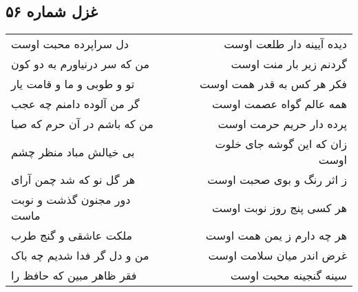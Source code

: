 \begin{center}
\section*{غزل شماره ۵۶}
\label{sec:sh056}
\begin{longtable}{l p{0.5cm} r}
دل سراپرده محبت اوست
&&
دیده آیینه دار طلعت اوست
\\
من که سر درنیاورم به دو کون
&&
گردنم زیر بار منت اوست
\\
تو و طوبی و ما و قامت یار
&&
فکر هر کس به قدر همت اوست
\\
گر من آلوده دامنم چه عجب
&&
همه عالم گواه عصمت اوست
\\
من که باشم در آن حرم که صبا
&&
پرده دار حریم حرمت اوست
\\
بی خیالش مباد منظر چشم
&&
زان که این گوشه جای خلوت اوست
\\
هر گل نو که شد چمن آرای
&&
ز اثر رنگ و بوی صحبت اوست
\\
دور مجنون گذشت و نوبت ماست
&&
هر کسی پنج روز نوبت اوست
\\
ملکت عاشقی و گنج طرب
&&
هر چه دارم ز یمن همت اوست
\\
من و دل گر فدا شدیم چه باک
&&
غرض اندر میان سلامت اوست
\\
فقر ظاهر مبین که حافظ را
&&
سینه گنجینه محبت اوست
\\
\end{longtable}
\end{center}
